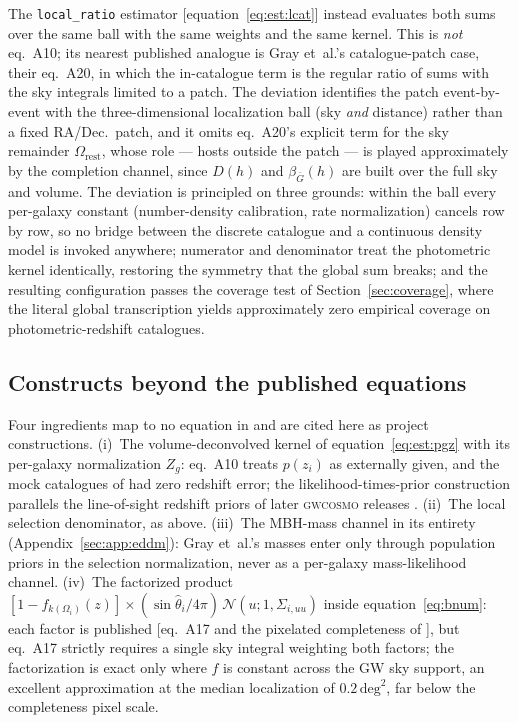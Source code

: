 The \texttt{local\_ratio} estimator [equation~\eqref{eq:est:lcat}]
instead evaluates both sums over the same ball with the same weights
and the same kernel.  This is \emph{not} eq.~A10; its nearest
published analogue is Gray et~al.'s catalogue-patch case, their
eq.~A20, in which the in-catalogue term is the regular ratio of sums
with the sky integrals limited to a patch.  The deviation identifies
the patch event-by-event with the three-dimensional localization ball
(sky \emph{and} distance) rather than a fixed RA/Dec.\ patch, and it
omits eq.~A20's explicit term for the sky remainder
$\Omega_\mathrm{rest}$, whose role --- hosts outside the patch --- is
played approximately by the completion channel, since $D(h)$ and
$\beta_{\bar G}(h)$ are built over the full sky and volume.
The deviation is principled on three grounds: within the ball every
per-galaxy constant (number-density calibration, rate normalization)
cancels row by row, so no bridge between the discrete catalogue and a
continuous density model is invoked anywhere; numerator and
denominator treat the photometric kernel identically, restoring the
symmetry that the global sum breaks; and the resulting configuration
passes the coverage test of Section~\ref{sec:coverage}, where the
literal global transcription yields approximately zero empirical
coverage on photometric-redshift catalogues.

\subsection{Constructs beyond the published equations}
\label{sec:app:gray:beyond}

Four ingredients map to no equation in \citet{Gray:2019ksv} and are
cited here as project constructions.  (i)~The volume-deconvolved
kernel of equation~\eqref{eq:est:pgz} with its per-galaxy
normalization $Z_g$: eq.~A10 treats $p(z_i)$ as externally given, and
the mock catalogues of \citet{Gray:2019ksv} had zero redshift error;
the likelihood-times-prior construction parallels the line-of-sight
redshift priors of later \textsc{gwcosmo} releases
\citep{Gray:2023wgj}.
(ii)~The local selection denominator, as above.  (iii)~The MBH-mass
channel in its entirety (Appendix~\ref{sec:app:eddm}): Gray et~al.'s
masses enter only through population priors in the selection
normalization, never as a per-galaxy mass-likelihood channel.
(iv)~The factorized product
$[1 - f_{k(\Omega_i)}(z)] \times (\sin\hat\theta_i/4\pi)\,
\mathcal{N}(u; 1, \Sigma_{i,uu})$ inside equation~\eqref{eq:bnum}:
each factor is published [eq.~A17 and the pixelated completeness of
\citealt{Gray:2021sew}], but eq.~A17
strictly requires a single sky integral weighting both factors; the
factorization is exact only where $f$ is constant across the GW sky
support, an excellent approximation at the median localization of
$0.2\,\mathrm{deg}^2$, far below the completeness pixel scale.


